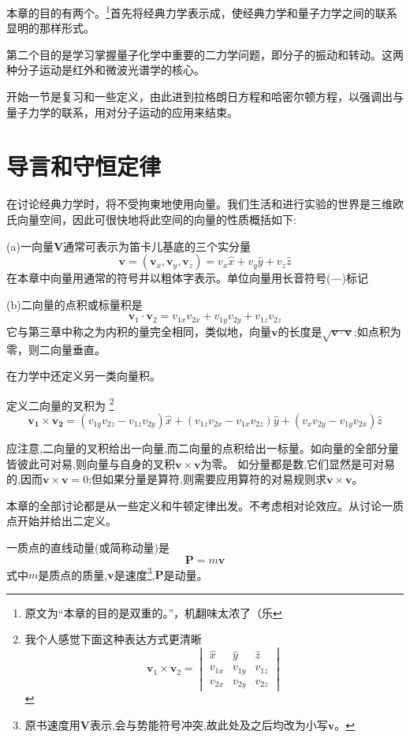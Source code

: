 本章的目的有两个。\footnote{原文为“本章的目的是双重的。”，机翻味太浓了（乐}首先将经典力学表示成，使经典力学和量子力学之间的联系显明的那样形式。

第二个目的是学习掌握量子化学中重要的二力学问题，即分子的振动和转动。这两种分子运动是红外和微波光谱学的核心。

开始一节是复习和一些定义，由此进到拉格朗日方程和哈密尔顿方程，以强调出与量子力学的联系，用对分子运动的应用来结束。

\section{导言和守恒定律}
在讨论经典力学时，将不受拘東地使用向量。我们生活和进行实验的世界是三维欧氏向量空间，因此可很快地将此空间的向量的性质概括如下:

(a)一向量$\mathbf{V}$通常可表示为笛卡儿基底的三个实分量
\[\mathbf{v}=(\mathbf{v}_x,\mathbf{v}_y,\mathbf{v}_z)=v_x\hat{x}+v_y\hat{y}+v_z\hat{z} \tag{4-1}\]
在本章中向量用通常的符号并以粗体字表示。单位向量用长音符号($\hat{ \quad }$)标记

(b)二向量的点积或标量积是
\[\mathbf{v}_1 \cdot \mathbf{v}_2=v_{1x}v_{2x}+v_{1y}v_{2y}+v_{1z}v_{2z} \tag{4-2}\]
它与第三章中称之为内积的量完全相同，类似地，向量$\mathbf{v}$的长度是$\sqrt{\mathbf{v} \cdot \mathbf{v}}$;如点积为零，则二向量垂直。

在力学中还定义另一类向量积。
\begin{definition}[叉积]
    定义二向量的叉积为
    \footnote{我个人感觉下面这种表达方式更清晰
    \[\mathbf{v}_1 \times \mathbf{v}_2=
    \begin{vmatrix}
        \hat{x} & \hat{y} & \hat{z} \\
        v_{1x} & v_{1y} & v_{1z} \\
        v_{2x} & v_{2y} & v_{2z}
    \end{vmatrix}
    \]}
    \[\mathbf{v_1} \times \mathbf{v_2}=(v_{1y}v_{2z}-v_{1z}v_{2y})\hat{x}+(v_{1z}v_{2x}-v_{1x}v_{2z})\hat{y}+(v_{x}v_{2y}-v_{1y}v_{2x})\hat{z} \tag{4-3}\]
\end{definition}

应注意,二向量的叉积给出一向量,而二向量的点积给出一标量。如向量的全部分量皆彼此可对易,则向量与自身的叉积$\mathbf{v} \times \mathbf{v}$为零。
如分量都是数,它们显然是可对易的,因而$\mathbf{v} \times \mathbf{v}=0$;但如果分量是算符,则需要应用算符的对易规则求$\mathbf{v} \times \mathbf{v}$。

本章的全部讨论都是从一些定义和牛顿定律出发。不考虑相对论效应。从讨论一质点开始并给出二定义。
\begin{definition}[动量]
    一质点的直线动量(或简称动量)是
    \[\mathbf{P}=m\mathbf{v} \tag{4-4}\]
    式中$m$是质点的质量,$\mathbf{v}$是速度\footnote{原书速度用$\mathbf{V}$表示,会与势能符号冲突,故此处及之后均改为小写$\mathbf{v}$。},$\mathbf{P}$是动量。
\end{definition}

